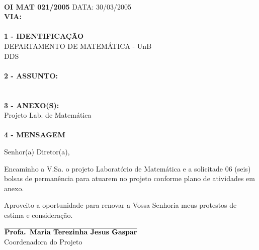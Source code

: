 \addtolength{\oddsidemargin}{-2pc}
\addtolength{\evensidemargin}{2pc}
\setlength{\topmargin}{.5cm}
\setlength{\textwidth}{17cm} 
\setlength{\textheight}{24cm}
\pagestyle{empty}

\vspace*{2mm}
\hspace*{1mm} 
\timbrado
\parindent=2cm 
\setlength{\baselineskip}{5mm}
\noindent 
\vspace*{1cm} \\
\begin{minipage}{17cm}
\vspace*{-8mm}
\parindent=2cm
\setlength{\baselineskip}{5mm}
\vspace*{-8mm}
\noindent
\small
{\bf  OI MAT  021/2005} \hfill {DATA:} {30/03/2005}
\vum \\
{\bf VIA:} {}  
\\
\mbox{} \hrulefill\
\\
{\bf 1 - IDENTIFICA\c{C}\~AO} 
\\
\phantom{xxx}{\bf Proced\^encia:} {DEPARTAMENTO DE MATEM\'ATICA - UnB}
\\
 {DDS}
\\
\mbox{} \hrulefill\
\\
{\bf 2 - ASSUNTO:} \\
\phantom{xxx}{Bolsa de perman\^encia}
\\
\mbox{} \hrulefill\
\\
{\bf 3 - ANEXO(S):} 
\\
\phantom{xxx} {Projeto Lab. de Matem\'atica} 
\\
\mbox{} \hrulefill\
\\
{ \bf 4 - MENSAGEM} 
\end{minipage}
\setlength{\baselineskip}{6mm}
\vspace*{2.5cm} 

Senhor(a) Diretor(a),
\vspace*{10mm}

Encaminho a V.Sa. o projeto Laborat\'orio de Matem\'atica e a solicita\cao de 06 (seis) bolsas de perman\^encia para atuarem no projeto conforme plano de atividades em anexo.

Aproveito a 
oportunidade para renovar a Vossa Senhoria meus protestos de estima e considera\c{c}\~ao. 
\vspace*{2.5cm} \\
\hspace*{5.5cm} 
\begin{minipage}{10cm}
\setlength{\baselineskip}{4mm}
\begin{center} 
$\overline{\phantom{}
\mbox{\bf  Profa. Maria Terezinha Jesus Gaspar}\phantom{}}$ 
\\
Coordenadora do Projeto
\end{center}
\end{minipage}

 
